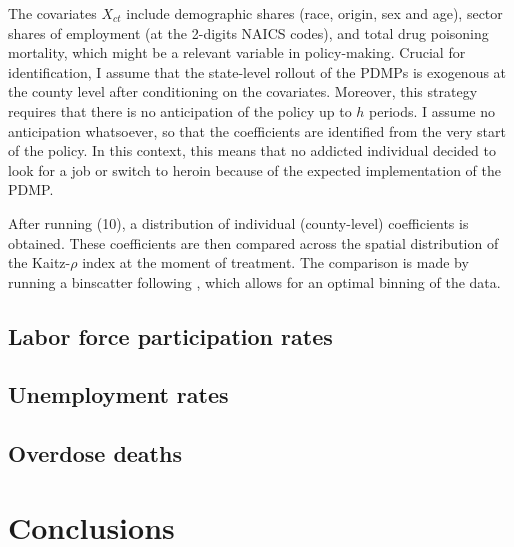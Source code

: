 \documentclass[12pt,a4paper]{article}
\begin{document}
The covariates \(X_{ct}\) include demographic shares (race, origin, sex and age), sector shares of employment (at the 2-digits NAICS codes), and total drug poisoning mortality, which might be a relevant variable in policy-making.
Crucial for identification, I assume that the state-level rollout of the PDMPs is exogenous at the county level after conditioning on the covariates.
Moreover, this strategy requires that there is no anticipation of the policy up to \(h\) periods. 
I assume no anticipation whatsoever, so that the coefficients are identified from the very start of the policy.
In this context, this means that no addicted individual decided to look for a job or switch to heroin because of the expected implementation of the PDMP. 

After running (10), a distribution of individual (county-level) coefficients is obtained.
These coefficients are then compared across the spatial distribution of the Kaitz-\(\rho\) index at the moment of treatment.
The comparison is made by running a binscatter following \textcite{Cattaneo2024}, which allows for an optimal binning of the data.

\subsection*{Labor force participation rates}

\subsection*{Unemployment rates}

\subsection*{Overdose deaths}

\section*{Conclusions}

\newpage

\printbibliography

\newpage
\end{document}
